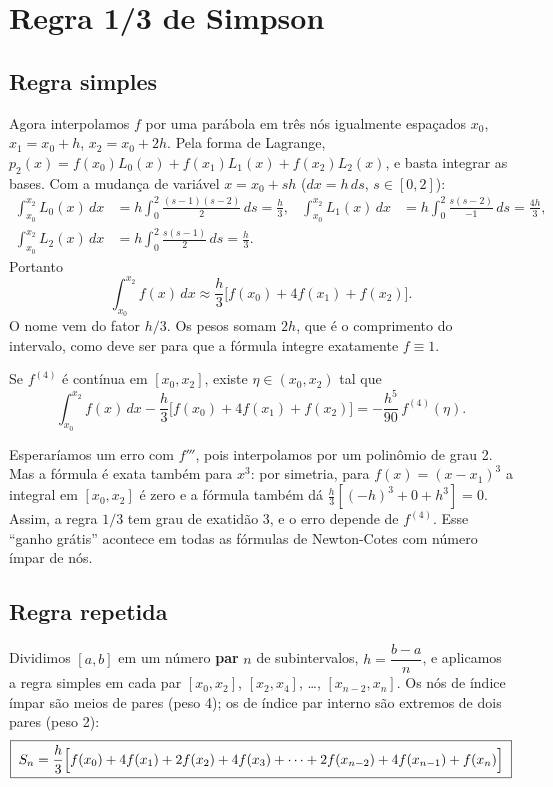 \section{Regra 1/3 de Simpson}

\subsection{Regra simples}

Agora interpolamos $f$ por uma parábola em três nós igualmente espaçados
$x_0$, $x_1=x_0+h$, $x_2=x_0+2h$. Pela forma de Lagrange,
$p_2(x)=f(x_0)L_0(x)+f(x_1)L_1(x)+f(x_2)L_2(x)$, e basta integrar as bases. Com a mudança de
variável $x=x_0+sh$ ($dx=h\,ds$, $s\in[0,2]$):
\begin{align*}
\int_{x_0}^{x_2}L_0(x)\,dx&=h\int_0^2\frac{(s-1)(s-2)}{2}\,ds=\frac{h}{3},&
\int_{x_0}^{x_2}L_1(x)\,dx&=h\int_0^2\frac{s(s-2)}{-1}\,ds=\frac{4h}{3},\\
\int_{x_0}^{x_2}L_2(x)\,dx&=h\int_0^2\frac{s(s-1)}{2}\,ds=\frac{h}{3}.
\end{align*}
Portanto
\[
\int_{x_0}^{x_2}f(x)\,dx\approx\frac{h}{3}\bigl[f(x_0)+4f(x_1)+f(x_2)\bigr].
\]
O nome vem do fator $h/3$. Os pesos somam $2h$, que é o comprimento do intervalo, como deve
ser para que a fórmula integre exatamente $f\equiv1$.

\begin{teorema}
Se $f^{(4)}$ é contínua em $[x_0,x_2]$, existe $\eta\in(x_0,x_2)$ tal que
\[
\int_{x_0}^{x_2}f(x)\,dx-\frac{h}{3}\bigl[f(x_0)+4f(x_1)+f(x_2)\bigr]=-\frac{h^5}{90}\,f^{(4)}(\eta).
\]
\end{teorema}

\begin{observacao}
Esperaríamos um erro com $f'''$, pois interpolamos por um polinômio de grau 2. Mas a
fórmula é exata também para $x^3$: por simetria, para $f(x)=(x-x_1)^3$ a integral em
$[x_0,x_2]$ é zero e a fórmula também dá $\frac h3[(-h)^3+0+h^3]=0$. Assim, a regra $1/3$
tem grau de exatidão 3, e o erro depende de $f^{(4)}$. Esse ``ganho grátis'' acontece em
todas as fórmulas de Newton-Cotes com número ímpar de nós.
\end{observacao}

\subsection{Regra repetida}

Dividimos $[a,b]$ em um número \textbf{par} $n$ de subintervalos, $h=\dfrac{b-a}{n}$, e
aplicamos a regra simples em cada par $[x_0,x_2]$, $[x_2,x_4]$, \dots, $[x_{n-2},x_n]$. Os
nós de índice ímpar são meios de pares (peso 4); os de índice par interno são extremos de
dois pares (peso 2):
\[
\boxed{\;S_n=\frac{h}{3}\Bigl[f(x_0)+4f(x_1)+2f(x_2)+4f(x_3)+\dots+2f(x_{n-2})+4f(x_{n-1})+f(x_n)\Bigr]\;}
\]

